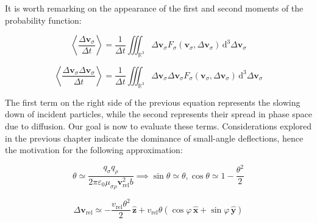 \fi

It is worth remarking on the appearance of the first and second moments of the probability function:

\begin{equation}
    \left\langle\frac{\Delta\mathbf{v}_\sigma}{\Delta t}\right\rangle=\frac{1}{\Delta t}\iiint_{\mathbb{R}^3}\Delta\mathbf{v}_\sigma F_\sigma(\mathbf{v}_\sigma,\Delta\mathbf{v}_\sigma)\,\mathrm{d}^3\Delta\mathbf{v}_\sigma
\end{equation}

\begin{equation}
    \left\langle\frac{\Delta\mathbf{v}_\sigma\Delta\mathbf{v}_\sigma}{\Delta t}\right\rangle=\frac{1}{\Delta t}\iiint_{\mathbb{R}^3}\Delta\mathbf{v}_\sigma\Delta\mathbf{v}_\sigma F_\sigma(\mathbf{v}_\sigma,\Delta\mathbf{v}_\sigma)\,\mathrm{d}^3\Delta\mathbf{v}_\sigma
\end{equation}

The first term on the right side of the previous equation represents the slowing down of incident particles, while the second represents their spread in phase space due to diffusion. Our goal is now to evaluate these terms. Considerations explored in the previous chapter indicate the dominance of small-angle deflections, hence the motivation for the following approximation:

\begin{equation}
    \theta\simeq\frac{q_\sigma q_\rho }{2\pi\varepsilon_0\mu_{\sigma\rho}\mathbf{v}_\text{rel}^2b}\implies\sin{\theta}\simeq\theta,\cos{\theta}\simeq1-\frac{\theta^2}{2}
\end{equation}

\begin{equation}
    \Delta\mathbf{v}_\text{rel}\simeq-\frac{v_\text{rel}\theta^2}{2}\,\mathbf{\hat{z}}+v_\text{rel}\theta\left(\cos{\varphi}\,\mathbf{\hat{x}}+\sin{\varphi}\,\mathbf{\hat{y}}\right)
\end{equation}

